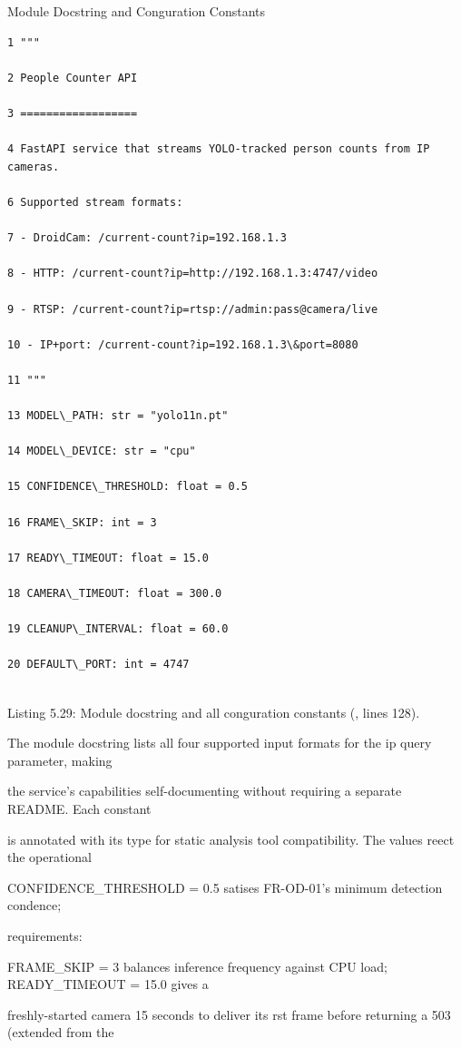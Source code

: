 Module Docstring and Conguration Constants

\begin{listingbox}
	\begin{verbatim}
1 """

2 People Counter API

3 ==================

4 FastAPI service that streams YOLO-tracked person counts from IP cameras.

6 Supported stream formats:

7 - DroidCam: /current-count?ip=192.168.1.3

8 - HTTP: /current-count?ip=http://192.168.1.3:4747/video

9 - RTSP: /current-count?ip=rtsp://admin:pass@camera/live

10 - IP+port: /current-count?ip=192.168.1.3\&port=8080

11 """

13 MODEL\_PATH: str = "yolo11n.pt"

14 MODEL\_DEVICE: str = "cpu"

15 CONFIDENCE\_THRESHOLD: float = 0.5

16 FRAME\_SKIP: int = 3

17 READY\_TIMEOUT: float = 15.0

18 CAMERA\_TIMEOUT: float = 300.0

19 CLEANUP\_INTERVAL: float = 60.0

20 DEFAULT\_PORT: int = 4747


\end{verbatim}
\end{listingbox}
Listing 5.29: Module docstring and all conguration constants (, lines 128).

The module docstring lists all four supported input formats for the ip query parameter, making

the service's capabilities self-documenting without requiring a separate README. Each constant

is annotated with its type for static analysis tool compatibility. The values reect the operational

CONFIDENCE\_THRESHOLD = 0.5 satises FR-OD-01's minimum detection condence;

requirements:

FRAME\_SKIP = 3 balances inference frequency against CPU load; READY\_TIMEOUT = 15.0 gives a

freshly-started camera 15 seconds to deliver its rst frame before returning a 503 (extended from the

